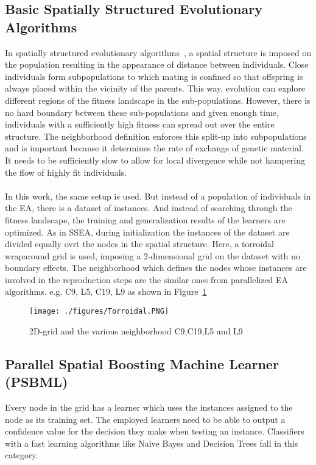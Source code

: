 \documentclass{llncs}
\begin{document}
\subsection{Basic Spatially Structured Evolutionary Algorithms}
In spatially structured evolutionary algorithms~\cite{tomassini2005spatially}, a spatial structure is imposed on the population resulting in the appearance of distance between individuals. Close individuals form subpopulations to which mating is confined so that offspring is always placed within the vicinity of the parents. This way, evolution can explore different regions of the fitness landscape in the sub-populations. However, there is no hard boundary between these sub-populations and given enough time, individuals with a sufficiently high fitness can spread out over the entire structure. The neighborhood definition enforces this split-up into subpopulations and is important because it determines the rate of exchange of genetic material. It needs to be sufficiently slow to allow for local divergence while not hampering the flow of highly fit individuals.
\paragraph{}
In this work, the same setup is used. But instead of a population of individuals in the EA, there is a dataset of instances. And instead of searching through the fitness landscape, the training and generalization results of the learners are optimized. As in SSEA, during initialization the instances of the dataset are divided equally ovrt the nodes in the spatial structure. Here, a torroidal wraparound grid is used, imposing a 2-dimensional grid on the dataset with no boundary effects. The neighborhood which defines the nodes whose instances are involved in the reproduction steps are the similar ones from parallelized EA algorithms. e.g. C9, L5, C19, L9 as shown in Figure~\ref{Grid}

\begin{figure}
\centering
\texttt{[image: ./figures/Torroidal.PNG]}
\caption{2D-grid and the various neighborhood C9,C19,L5 and L9}
\label{Grid}
\end{figure}


\subsection{Parallel Spatial Boosting Machine Learner (PSBML)}
Every node in the grid has a learner which uses the instances assigned to the node as its training set. The employed learners need to be able to output a confidence value for the decision they make when testing an instance. Classifiers with a fast learning algorithms like Naive Bayes and Decision Trees fall in this category.
\end{document}
